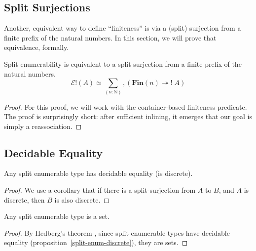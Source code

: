 \subsection{Split Surjections}
Another, equivalent way to define ``finiteness'' is via a (split) surjection
from a finite prefix of the natural numbers.
In this section, we will prove that equivalence, formally.

\begin{rm-theorem} \label{split-enum-surj}
  Split enumerability is equivalent to a split surjection from a finite prefix
  of the natural numbers.
  \begin{equation}
    \mathcal{E}!(A) \simeq \sum_{(n : \mathbb{N})} , \left( \mathbf{Fin}(n) \twoheadrightarrow ! \; A \right)
  \end{equation}
\end{rm-theorem}
\begin{proof}
  For this proof, we will work with the container-based finiteness predicate.
  The proof is surprisingly short: after sufficient inlining, it emerges that
  our goal is simply a reassociation.
\end{proof}
\subsection{Decidable Equality}
\begin{rm-lemma} \label{split-enum-discrete}
  Any split enumerable type has decidable equality (is discrete).
\end{rm-lemma}
\begin{proof}
  We use a corollary that if there is a split-surjection from \(A\) to \(B\),
  and \(A\) is discrete, then \(B\) is also discrete.
\end{proof}
\begin{rm-lemma}
  Any split enumerable type is a set.
\end{rm-lemma}
\begin{proof}
  By Hedberg's theorem \cite{hedbergCoherenceTheoremMartinLof1998}, since split
  enumerable types have decidable equality
  (proposition~\ref{split-enum-discrete}), they are sets.
\end{proof}
